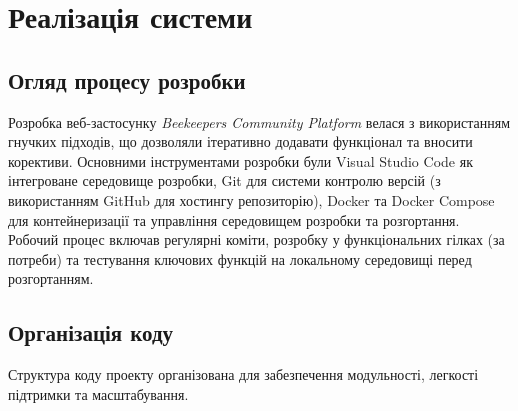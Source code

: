 \chapter{Реалізація системи}
\label{ch:implementation}

\section{Огляд процесу розробки}
\label{sec:dev_process}
Розробка веб-застосунку \textit{Beekeepers Community Platform} велася з використанням гнучких підходів, що дозволяли ітеративно додавати функціонал та вносити корективи. Основними інструментами розробки були Visual Studio Code як інтегроване середовище розробки, Git для системи контролю версій (з використанням GitHub для хостингу репозиторію), Docker та Docker Compose для контейнеризації та управління середовищем розробки та розгортання. Робочий процес включав регулярні коміти, розробку у функціональних гілках (за потреби) та тестування ключових функцій на локальному середовищі перед розгортанням.

\section{Організація коду}
\label{sec:code_organization}
Структура коду проекту організована для забезпечення модульності, легкості підтримки та масштабування.

